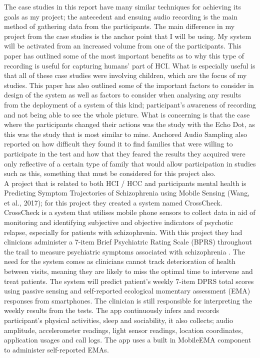 \documentclass[a4paper,11pt]{report}
\begin{document}
The case studies in this report have many similar techniques for achieving its goals as my project; the antecedent and ensuing audio recording is the main method of gathering data from the participants. The main difference in my project from the case studies is the anchor point that I will be using. My system will be activated from an increased volume from one of the participants. This paper has outlined some of the most important benefits as to why this type of recording is useful for capturing humans’ part of HCI. What is especially useful is that all of these case studies were involving children, which are the focus of my studies. This paper has also outlined some of the important factors to consider in design of the system as well as factors to consider when analysing any results from the deployment of a system of this kind; participant’s awareness of recording and not being able to see the whole picture. What is concerning is that the case where the participants changed their actions was the study with the Echo Dot, as this was the study that is most similar to mine. Anchored Audio Sampling also reported on how difficult they found it to find families that were willing to participate in the test and how that they feared the results they acquired were only reflective of a certain type of family that would allow participation in studies such as this, something that must be considered for this project also.\\

A project that is related to both HCI / HCC  and participants mental health is Predicting Symptom Trajectories of Schizophrenia using Mobile Sensing (Wang, et al., 2017); for this project they created a system named CrossCheck. CrossCheck is a system that utilises mobile phone sensors to collect data in aid of monitoring and identifying subjective and objective indicators of psychotic relapse, especially for patients with schizophrenia. With this project they had clinicians administer a 7-item Brief Psychiatric Rating Scale (BPRS) throughout the trail to measure psychiatric symptoms associated with schizophrenia . The need for the system comes as clinicians cannot track deterioration of health between visits, meaning they are likely to miss the optimal time to intervene and treat patients. The system will predict patient’s weekly 7-item DPRS total scores using passive sensing and self-reported ecological momentary assessment (EMA) responses from smartphones. The clinician is still responsible for interpreting the weekly results from the tests. The app continuously infers and records participant’s physical activities, sleep and sociability, it also collects; audio amplitude, accelerometer readings, light sensor readings, location coordinates, application usages and call logs. The app uses a built in MobileEMA component to administer self-reported EMAs.\\
\end{document}
